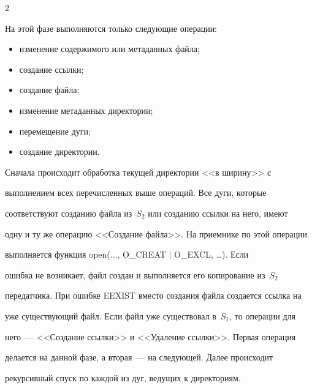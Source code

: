\begin{multicols}{2}
\vspace*{-1pt}


      


      На этой фазе выполняются только следующие операции:


      \pagebreak


      


      \noindent


\begin{itemize}


\item изменение содержимого или метаданных \mbox{файла;}


\item создание ссылки;


\item создание файла;


\item изменение метаданных директории;


\item перемещение дуги;


\item создание директории.


\end{itemize}





      Сначала происходит обработка текущей директории <<в ширину>> с 


выполнением всех перечисленных выше операций. Все дуги, которые 


соответствуют созданию файла из~$S_2$ или созданию ссылки на него, имеют 


одну и ту же операцию <<Создание файла>>. На приемнике по этой операции 


выполняется функция open($\ldots$, O\_CREAT $\vert$ O\_EXCL, \ldots). Если 


ошибка не возникает, файл создан и выполняется его копирование из~$S_2$ 


передатчика. При ошибке EEXIST вместо создания файла создается ссылка на 


уже существующий файл. Если файл уже существовал в~$S_1$, то операции для 


него~--- <<Создание ссылки>> и <<Удаление ссылки>>. Первая операция 


делается на данной фазе, а вторая~--- на следующей. Далее происходит 


рекурсивный спуск по каждой из дуг, ведущих к директориям.






\end{multicols}
